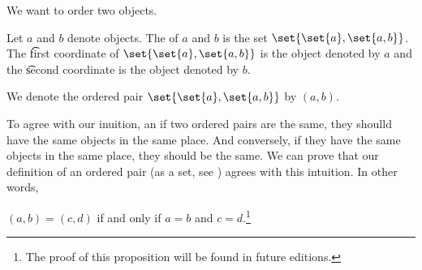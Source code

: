 

We want to order two objects.


Let $a$ and $b$ denote objects.
The  of $a$ and $b$ is the set $\set{\set{a}, \set{a, b}}$.
The \t{first coordinate} of $\set{\set{a}, \set{a, b}}$ is the object denoted by $a$ and the \t{second coordinate} is the object denoted by $b$.



We denote the ordered pair $\set{\set{a},\set{a,b}}$ by $(a, b)$.

To agree with our inuition, an if two ordered pairs are the same, they shoulld have the same objects in the same place.
And conversely, if they have the same objects in the same place, they should be the same.
We can prove that our definition of an ordered pair (as a set, see ) agrees with this intuition.
In other words,

\begin{proposition}
  $(a, b) = (c, d)$ if and only if $a = b$ and $c = d$.\footnote{The proof of this proposition will be found in future editions.%
}
\end{proposition}

\blankpage
